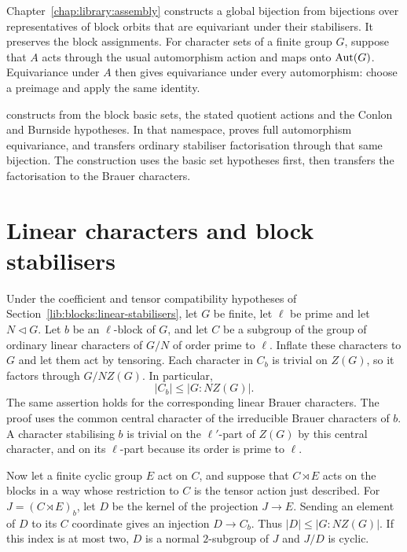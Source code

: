 Chapter~\ref{chap:library:assembly} constructs a global bijection from
bijections over representatives of block orbits that are equivariant under
their stabilisers.
It preserves the block assignments. For character sets of a finite group
$G$, suppose that $A$ acts through the usual automorphism action and maps
onto $\operatorname{Aut}(G)$. Equivariance under $A$ then gives equivariance under every
automorphism: choose a preimage and apply the same identity.

\begin{implementation}
 constructs
 from the block basic sets, the stated quotient
actions and the Conlon and Burnside hypotheses. In that namespace,
 proves full automorphism
equivariance, and  transfers
ordinary stabiliser factorisation through that same bijection. The
construction uses the basic set hypotheses first, then transfers the
factorisation to the Brauer characters.
\end{implementation}

\section{Linear characters and block stabilisers}

Under the coefficient and tensor compatibility hypotheses of
Section~\ref{lib:blocks:linear-stabilisers}, let $G$ be finite,
let $\ell$ be prime and let $N\lhd G$.
Let $b$ be an $\ell$-block of $G$, and let $C$ be a
subgroup of the group of ordinary linear characters of $G/N$ of order
prime to $\ell$. Inflate these characters to $G$ and let them act by
tensoring. Each character in $C_b$ is trivial on $Z(G)$, so it factors
through $G/NZ(G)$. In particular,
\[
 |C_b|\leq |G:NZ(G)|.
\]
The same assertion holds for the corresponding linear Brauer characters.
The proof uses the common central character of the irreducible Brauer
characters of $b$. A character stabilising $b$ is trivial on the
$\ell'$-part of $Z(G)$ by this central character, and on its $\ell$-part
because its order is prime to $\ell$.

Now let a finite cyclic group $E$ act on $C$, and suppose that $C\rtimes E$
acts on the blocks in a way whose restriction to $C$ is the tensor
action just described. For $J=(C\rtimes E)_b$, let $D$ be the kernel
of the projection $J\longrightarrow E$. Sending an element of $D$ to
its $C$ coordinate gives an injection $D\longrightarrow C_b$.
Thus $|D|\leq |G:NZ(G)|$. If this index is at most two, $D$ is a normal
$2$-subgroup of $J$ and $J/D$ is cyclic.

